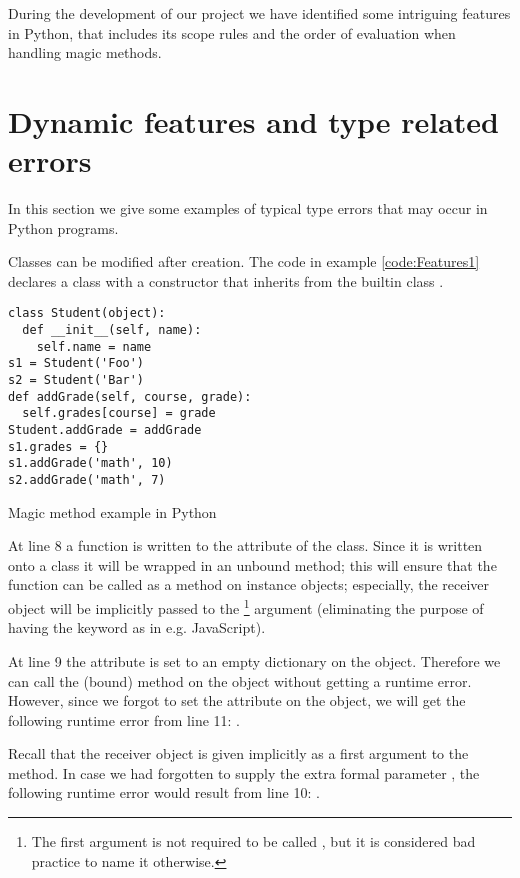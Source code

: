 During the development of our project we have identified some intriguing features in Python, that includes its scope rules and the order of evaluation when handling magic methods.

\section{Dynamic features and type related errors}
\label{Features}
In this section we give some examples of typical type errors that may occur in Python programs.

Classes can be modified after creation. The code in example \ref{code:Features1} declares a class  with a constructor that inherits from the builtin class .

\begin{listing}[H]
  \begin{verbatim}
class Student(object):
  def __init__(self, name):
    self.name = name
s1 = Student('Foo')
s2 = Student('Bar')
def addGrade(self, course, grade):
  self.grades[course] = grade
Student.addGrade = addGrade
s1.grades = {}
s1.addGrade('math', 10)
s2.addGrade('math', 7)
  \end{verbatim}
  \caption{Magic method example in Python}
  \label{code:Features1}
\end{listing}

At line 8 a function  is written to the  attribute of the  class. Since it is written onto a class it will be wrapped in an unbound method; this will ensure that the function can be called as a method on instance objects; especially, the receiver object will be implicitly passed to the \footnote{The first argument is not required to be called , but it is considered bad practice to name it otherwise.} argument (eliminating the purpose of having the  keyword as in e.g. JavaScript).

At line 9 the attribute  is set to an empty dictionary on the  object. Therefore we can call the (bound) method  on the  object without getting a runtime error. However, since we forgot to set the  attribute on the  object, we will get the following runtime error from line 11: . 

Recall that the receiver object is given implicitly as a first argument to the  method. 
In case we had forgotten to supply the extra formal parameter , the following runtime error would result from line 10:
. 

